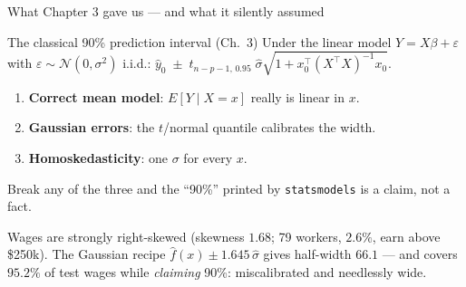\documentclass[aspectratio=169,11pt]{beamer}
\begin{document}
\begin{frame}{What Chapter 3 gave us --- and what it silently assumed}
  \footnotesize
  \begin{block}{The classical 90\% prediction interval (Ch.\ 3)}
    Under the linear model $Y = X\beta + \varepsilon$ with
    $\varepsilon \sim \mathcal{N}(0, \sigma^2)$ i.i.d.:
    \quad $\hat y_0 \;\pm\; t_{n-p-1,\,0.95}\;\hat\sigma
      \sqrt{1 + x_0^\top (X^\top X)^{-1} x_0}$.
  \end{block}
  \begin{readme}
    \begin{enumerate}
      \item \textbf{Correct mean model}: $E[Y \mid X = x]$ really is linear in $x$.
      \item \textbf{Gaussian errors}: the $t$/normal quantile calibrates the width.
      \item \textbf{Homoskedasticity}: one $\sigma$ for every $x$.
    \end{enumerate}
    Break any of the three and the ``90\%'' printed by \texttt{statsmodels} is a claim,
    not a fact.
  \end{readme}
  \begin{numexample}
    Wages are strongly right-skewed (skewness $1.68$; 79 workers, $2.6\%$, earn above
    \$250k). The Gaussian recipe $\hat f(x) \pm 1.645\,\hat\sigma$ gives half-width
    $66.1$ --- and covers $95.2\%$ of test wages while \emph{claiming} 90\%:
    miscalibrated and needlessly wide.
  \end{numexample}
\end{frame}
\end{document}
